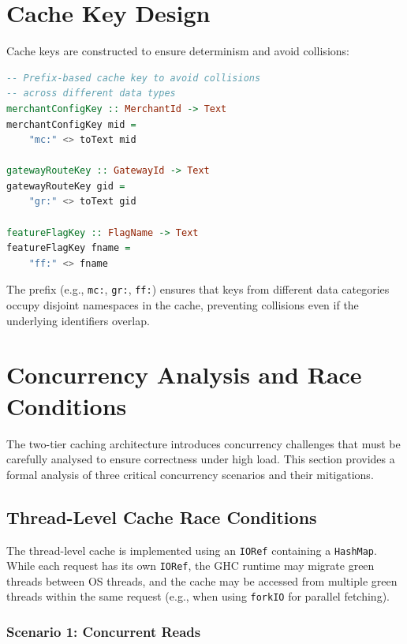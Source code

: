 \documentclass[12pt,a4paper]{report}
\begin{document}
\section{Cache Key Design}

Cache keys are constructed to ensure determinism and avoid collisions:

\begin{lstlisting}[language=Haskell, caption={Cache Key Construction}]
-- Prefix-based cache key to avoid collisions
-- across different data types
merchantConfigKey :: MerchantId -> Text
merchantConfigKey mid =
    "mc:" <> toText mid

gatewayRouteKey :: GatewayId -> Text
gatewayRouteKey gid =
    "gr:" <> toText gid

featureFlagKey :: FlagName -> Text
featureFlagKey fname =
    "ff:" <> fname
\end{lstlisting}

The prefix (e.g., \texttt{mc:}, \texttt{gr:}, \texttt{ff:}) ensures that keys from different data categories occupy disjoint namespaces in the cache, preventing collisions even if the underlying identifiers overlap.

\section{Concurrency Analysis and Race Conditions}
\label{sec:concurrency}

The two-tier caching architecture introduces concurrency challenges that must be carefully analysed to ensure correctness under high load. This section provides a formal analysis of three critical concurrency scenarios and their mitigations.

\subsection{Thread-Level Cache Race Conditions}

The thread-level cache is implemented using an \texttt{IORef} containing a \texttt{HashMap}. While each request has its own \texttt{IORef}, the GHC runtime may migrate green threads between OS threads, and the cache may be accessed from multiple green threads within the same request (e.g., when using \texttt{forkIO} for parallel fetching).

\subsubsection{Scenario 1: Concurrent Reads}
\end{document}

